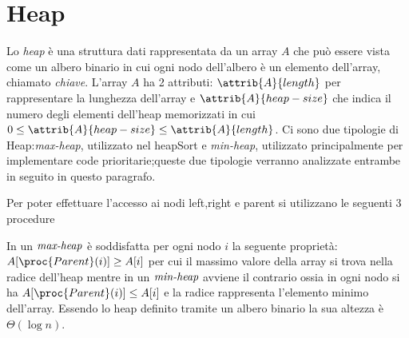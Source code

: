 \chapter{Heap}
Lo \emph{heap} è una struttura dati rappresentata da un array $A$ che può essere vista come un albero binario
in cui ogni nodo dell'albero è un elemento dell'array, chiamato \emph{chiave}.\newline
L'array $A$ ha 2 attributi: $\attrib{A}{length}$ per rappresentare la lunghezza dell'array
e $\attrib{A}{heap-size}$ che indica il numero degli elementi dell'heap memorizzati
in cui $0 \leq \attrib{A}{heap-size} \leq \attrib{A}{length}$.
Ci sono due tipologie di Heap:\emph{max-heap}, utilizzato nel heapSort e \emph{min-heap},
utilizzato principalmente per implementare code prioritarie;queste due tipologie verranno analizzate entrambe
in seguito in questo paragrafo.


Per poter effettuare l'accesso ai nodi left,right e parent si utilizzano le seguenti 3 procedure

In un $\emph{max-heap}$ è soddisfatta per ogni nodo $i$ la seguente proprietà:
$A[\proc{Parent}(i)] \geq A[i]$ per cui il massimo valore della array si trova nella radice
dell'heap mentre in un $\emph{min-heap}$ avviene il contrario ossia in ogni nodo si ha
$A[\proc{Parent}(i)] \leq A[i]$ e la radice rappresenta l'elemento minimo dell'array.
Essendo lo heap definito tramite un albero binario la sua altezza è $\Theta(\log n)$.




